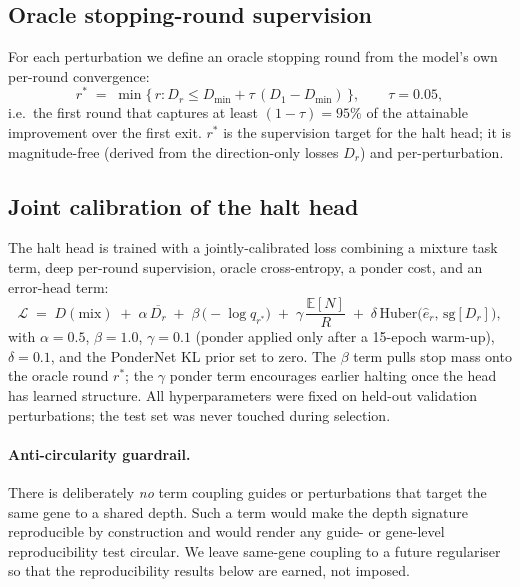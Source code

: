 \documentclass[11pt]{article}
\newcommand{\EN}{\ensuremath{\mathbb{E}[N]}}
\newcommand{\rstar}{\ensuremath{r^{\!*}}}
\begin{document}
\subsection{Oracle stopping-round supervision}
\label{sec:oracle}

For each perturbation we define an oracle stopping round from the model's own per-round
convergence:
\begin{equation}
\rstar \;=\; \min\Big\{\, r : D_r \le D_{\min} + \tau\,(D_1 - D_{\min}) \,\Big\}, \qquad \tau=0.05,
\end{equation}
i.e.\ the first round that captures at least $(1-\tau)=95\%$ of the attainable improvement over
the first exit. \rstar{} is the supervision target for the halt head; it is magnitude-free
(derived from the direction-only losses $D_r$) and per-perturbation.

\subsection{Joint calibration of the halt head}
\label{sec:calib}

The halt head is trained with a jointly-calibrated loss combining a mixture task term, deep
per-round supervision, oracle cross-entropy, a ponder cost, and an error-head term:
\begin{equation}
\mathcal{L} \;=\; D(\text{mix}) \;+\; \alpha\,\overline{D_r} \;+\; \beta\,\big(-\log q_{\rstar}\big)
\;+\; \gamma\,\frac{\EN{}}{R} \;+\; \delta\,\mathrm{Huber}\!\big(\hat{e}_r,\, \mathrm{sg}[D_r]\big),
\end{equation}
with $\alpha=0.5$, $\beta=1.0$, $\gamma=0.1$ (ponder applied only after a 15-epoch warm-up),
$\delta=0.1$, and the PonderNet KL prior set to zero. The $\beta$ term pulls stop mass onto the
oracle round \rstar{}; the $\gamma$ ponder term encourages earlier halting once the head has
learned structure. All hyperparameters were fixed on held-out validation perturbations; the test
set was never touched during selection.

\paragraph{Anti-circularity guardrail.} There is deliberately \emph{no} term coupling guides or
perturbations that target the same gene to a shared depth. Such a term would make the depth
signature reproducible by construction and would render any guide- or gene-level reproducibility
test circular. We leave same-gene coupling to a future regulariser so that the reproducibility
results below are earned, not imposed.
\end{document}
